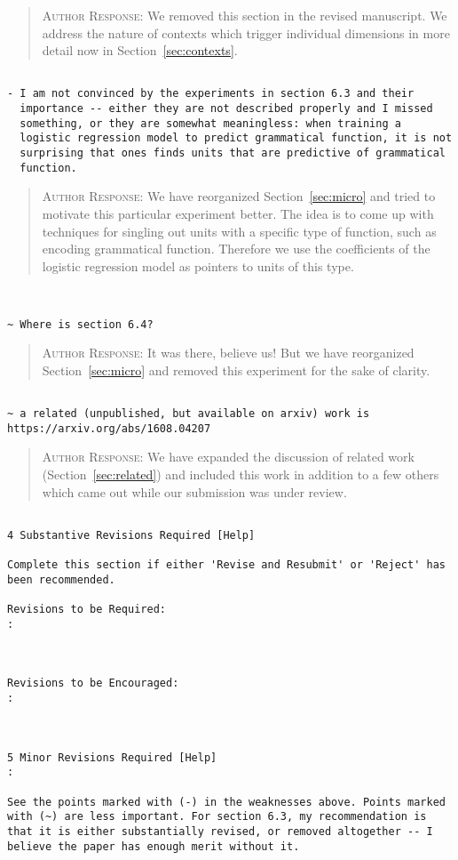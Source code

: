 \begin{quote}
\textsc{Author Response:} We removed this section in the revised manuscript. We address the nature of contexts which trigger individual dimensions in more detail now in Section~\ref{sec:contexts}.
\end{quote}
\begin{verbatim}

- I am not convinced by the experiments in section 6.3 and their
  importance -- either they are not described properly and I missed
  something, or they are somewhat meaningless: when training a
  logistic regression model to predict grammatical function, it is not
  surprising that ones finds units that are predictive of grammatical
  function.
\end{verbatim}  
\begin{quote}
\textsc{Author Response:}  We have reorganized Section~\ref{sec:micro} and 
tried to motivate this particular experiment better. The idea is to 
come up with techniques for singling out units with a specific type
of function, such as encoding grammatical function. Therefore we 
use the coefficients of the logistic regression model as pointers 
to units of this type.
\end{quote}
\begin{verbatim}


~ Where is section 6.4?

\end{verbatim}  
\begin{quote}
\textsc{Author Response:} It was there, believe us! But we have reorganized 
Section~\ref{sec:micro} and removed this experiment for the sake of clarity.
\end{quote}
\begin{verbatim}

~ a related (unpublished, but available on arxiv) work is
https://arxiv.org/abs/1608.04207

\end{verbatim}  
\begin{quote}
\textsc{Author Response:}  We have expanded the discussion of related work 
(Section~\ref{sec:related}) and included this work in addition to a few others which 
came out while our submission was under review.
\end{quote}
\begin{verbatim}

4 Substantive Revisions Required [Help]

Complete this section if either 'Revise and Resubmit' or 'Reject' has
been recommended.

Revisions to be Required:
: 



Revisions to be Encouraged:
: 



5 Minor Revisions Required [Help]
:

See the points marked with (-) in the weaknesses above. Points marked
with (~) are less important. For section 6.3, my recommendation is
that it is either substantially revised, or removed altogether -- I
believe the paper has enough merit without it.

\end{verbatim}  
